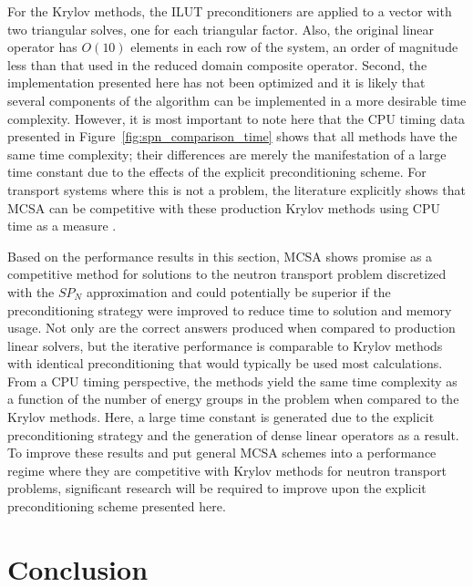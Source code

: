 \documentclass[letterpaper,12pt]{article}
\begin{document}
For the Krylov methods, the ILUT preconditioners are applied to a
vector with two triangular solves, one for each triangular
factor. Also, the original linear operator has $O(10)$ elements in
each row of the system, an order of magnitude less than that used in
the reduced domain composite operator. Second, the implementation
presented here has not been optimized and it is likely that several
components of the algorithm can be implemented in a more desirable
time complexity. However, it is most important to note here that the
CPU timing data presented in Figure~\ref{fig:spn_comparison_time}
shows that all methods have the same time complexity; their
differences are merely the manifestation of a large time constant due
to the effects of the explicit preconditioning scheme. For transport
systems where this is not a problem, the literature explicitly shows
that MCSA can be competitive with these production Krylov methods
using CPU time as a measure \cite{evans_monte_2012}.

Based on the performance results in this section, MCSA shows promise
as a competitive method for solutions to the neutron transport problem
discretized with the $SP_N$ approximation and could potentially be
superior if the preconditioning strategy were improved to reduce time
to solution and memory usage. Not only are the correct answers
produced when compared to production linear solvers, but the iterative
performance is comparable to Krylov methods with identical
preconditioning that would typically be used most calculations. From a
CPU timing perspective, the methods yield the same time complexity as
a function of the number of energy groups in the problem when compared
to the Krylov methods. Here, a large time constant is generated due to
the explicit preconditioning strategy and the generation of dense
linear operators as a result. To improve these results and put general
MCSA schemes into a performance regime where they are competitive with
Krylov methods for neutron transport problems, significant research
will be required to improve upon the explicit preconditioning scheme
presented here.

\section{Conclusion}
\label{sec:conclusion}
\end{document}
